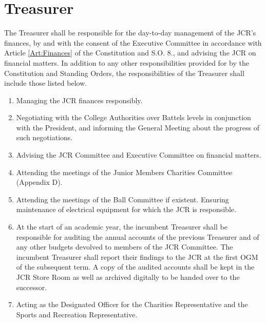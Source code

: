 \section{Treasurer}
\npara The Treasurer shall be responsible for the day-to-day management of the JCR's finances, by and with the consent of the Executive Committee in accordance with Article \ref{Art:Finances} of the Constitution and S.O. 8., and advising the JCR on financial matters.
\npara In addition to any other responsibilities provided for by the Constitution and Standing Orders, the responsibilities of the Treasurer shall include those listed below.
\begin{enumerate}
	\item Managing the JCR finances responsibly.     
	\item Negotiating with the College Authorities over Battels levels in conjunction with the President, and informing the General Meeting about the progress of such negotiations.
	\item Advising the JCR Committee and Executive Committee on financial matters.
	\item Attending the meetings of the Junior Members Charities Committee (Appendix D).          
	\item Attending the meetings of the Ball Committee if existent.     
	Ensuring maintenance of electrical equipment for which the JCR is responsible.     
	\item At the start of an academic year, the incumbent Treasurer shall be responsible for auditing the annual accounts of the previous Treasurer and of any other budgets devolved to members of the JCR Committee.
	The incumbent Treasurer shall report their findings to the JCR at the first OGM of the subsequent term.
	A copy of the audited accounts shall be kept in the JCR Store Room as well as archived digitally to be handed over to the successor.
	\item Acting as the Designated Officer for the Charities Representative and the Sports and Recreation Representative.
\end{enumerate}
